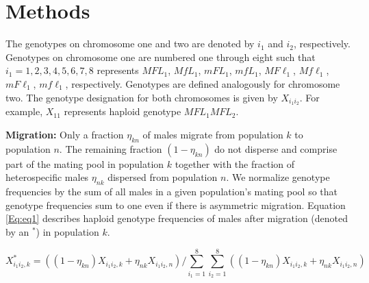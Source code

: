 \documentclass[11pt]{article}
\begin{document}
 

\section*{Methods}
The genotypes on chromosome one and two are denoted by $i_1$ and $i_2$, respectively.  Genotypes on chromosome one are numbered one through eight such that $i_1 = 1, 2, 3, 4, 5, 6, 7, 8$ represents $M F L_1$, $M f L_1$, $m F L_1$, $m f L_1$, $M F \ell_1$, $M f \ell_1$, $m F \ell_1$, $m f \ell_1$, respectively. Genotypes are defined analogously for chromosome two. The genotype designation for both chromosomes is given by $X_{i_1 i_2}$.  For example, $X_{1 1}$ represents haploid genotype $M F L_1 M F L_2$.

\noindent \textbf{Migration:} Only a fraction $\eta_{kn}$ of males migrate from population $k$ to population $n$.  The remaining fraction $(1-\eta_{kn})$ do not disperse and comprise part of the mating pool in population $k$ together with the fraction of heterospecific males $\eta_{nk}$ dispersed from population $n$.  We normalize genotype frequencies by the sum of all males in a given population's mating pool so that genotype frequencies sum to one even if there is asymmetric migration.  Equation \ref{Eq:eq1} describes haploid genotype frequencies of males after migration (denoted by an $^*$) in population $k$.  

\begin{equation}\label{Eq:eq1}
X^*_{{i_1 i_2}, k} = ((1 - \eta_{kn}) X_{{i_1 i_2}, k} + \eta_{nk} X_{{i_1 i_2}, n})/ \sum_{i_1 =1}^{8} \sum_{i_2=1}^{8} ((1 - \eta_{kn}) X_{{i_1 i_2}, k} + \eta_{nk} X_{{i_1 i_2}, n})
\end{equation}
\end{document}
